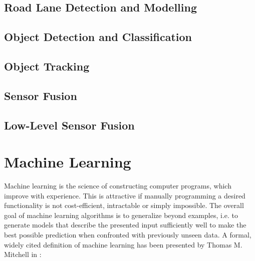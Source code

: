 \subsection{Road Lane Detection and Modelling}
\label{subsec:lane}
\subsection{Object Detection and Classification}
\label{subsec:obj_detect}
\subsection{Object Tracking}
\label{subsec:obj_track}
\subsection{Sensor Fusion}
\label{subsec:sensor_fusion}
\subsection{Low-Level Sensor Fusion}
\section{Machine Learning}
Machine learning is the science of constructing computer programs, which improve with experience. 
This is attractive if manually programming a desired functionality is not cost-efficient, intractable or simply impossible.  
The overall goal of machine learning algorithms is to generalize beyond examples, i.e. to generate models that describe the presented input sufficiently well to make the best possible prediction when confronted with previously unseen data.
A formal, widely cited definition of machine learning has been presented by Thomas M. Mitchell in \cite{Mitchell1997}:

